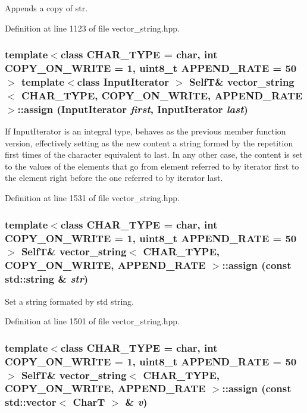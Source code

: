 Appends a copy of str. 

Definition at line 1123 of file vector\_\-string.hpp.\hypertarget{classvector__string_763bc15c22982c7fa76f1419e67d53b5}{
\subsubsection[{assign}]{\setlength{\rightskip}{0pt plus 5cm}template$<$class CHAR\_\-TYPE  = char, int COPY\_\-ON\_\-WRITE = 1, uint8\_\-t APPEND\_\-RATE = 50$>$ template$<$class InputIterator $>$ {\bf SelfT}\& {\bf vector\_\-string}$<$ CHAR\_\-TYPE, COPY\_\-ON\_\-WRITE, APPEND\_\-RATE $>$::assign (InputIterator {\em first}, \/  InputIterator {\em last})}}
\label{classvector__string_763bc15c22982c7fa76f1419e67d53b5}


If InputIterator is an integral type, behaves as the previous member function version, effectively setting as the new content a string formed by the repetition first times of the character equivalent to last. In any other case, the content is set to the values of the elements that go from element referred to by iterator first to the element right before the one referred to by iterator last. 

Definition at line 1531 of file vector\_\-string.hpp.\hypertarget{classvector__string_945a71bc52a850219f28f7c19afd2a13}{
\subsubsection[{assign}]{\setlength{\rightskip}{0pt plus 5cm}template$<$class CHAR\_\-TYPE  = char, int COPY\_\-ON\_\-WRITE = 1, uint8\_\-t APPEND\_\-RATE = 50$>$ {\bf SelfT}\& {\bf vector\_\-string}$<$ CHAR\_\-TYPE, COPY\_\-ON\_\-WRITE, APPEND\_\-RATE $>$::assign (const std::string \& {\em str})}}
\label{classvector__string_945a71bc52a850219f28f7c19afd2a13}


Set a string formated by std string. 

Definition at line 1501 of file vector\_\-string.hpp.\hypertarget{classvector__string_afc4812e811663b17b6239b7ae2343e3}{
\subsubsection[{assign}]{\setlength{\rightskip}{0pt plus 5cm}template$<$class CHAR\_\-TYPE  = char, int COPY\_\-ON\_\-WRITE = 1, uint8\_\-t APPEND\_\-RATE = 50$>$ {\bf SelfT}\& {\bf vector\_\-string}$<$ CHAR\_\-TYPE, COPY\_\-ON\_\-WRITE, APPEND\_\-RATE $>$::assign (const std::vector$<$ CharT $>$ \& {\em v})}}
\label{classvector__string_afc4812e811663b17b6239b7ae2343e3}


